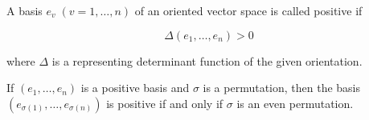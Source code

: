 A basis $e_v\;(v = 1, \ldots, n)$ of an oriented vector space is called positive if

$$\Delta(e_1, \ldots, e_n) > 0$$

where $\Delta$ is a representing determinant function of the given orientation.

If $(e_1, \ldots, e_n)$ is a positive basis and $\sigma$ is a permutation, then the basis $(e_{\sigma(1)}, \ldots, e_{\sigma(n)})$ is positive if and only if $\sigma$ is an even permutation.
